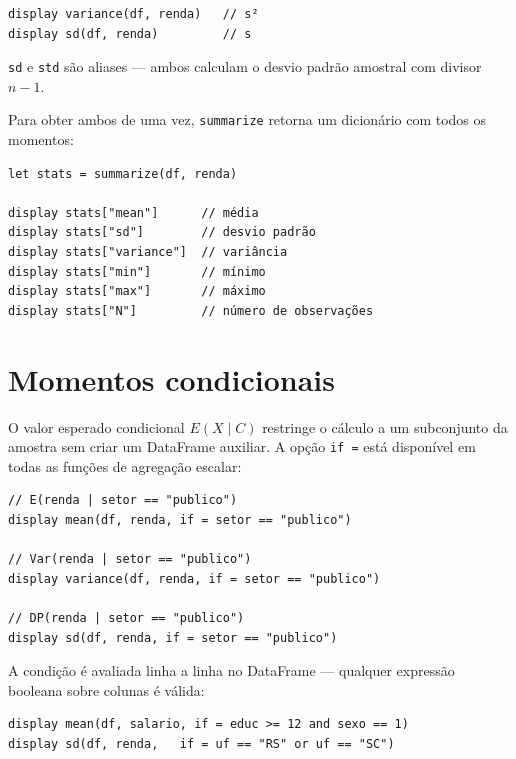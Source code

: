 \begin{lstlisting}[caption={Variância e desvio padrão}]
display variance(df, renda)   // s²
display sd(df, renda)         // s
\end{lstlisting}

\begin{nota}
  \lstinline{sd} e \lstinline{std} são aliases — ambos calculam o desvio padrão
  amostral com divisor $n-1$.
\end{nota}

Para obter ambos de uma vez, \lstinline{summarize} retorna um dicionário com
todos os momentos:

\begin{lstlisting}
let stats = summarize(df, renda)

display stats["mean"]      // média
display stats["sd"]        // desvio padrão
display stats["variance"]  // variância
display stats["min"]       // mínimo
display stats["max"]       // máximo
display stats["N"]         // número de observações
\end{lstlisting}

\section{Momentos condicionais}

O valor esperado condicional $E(X \mid C)$ restringe o cálculo a um subconjunto
da amostra sem criar um DataFrame auxiliar. A opção \lstinline{if =} está
disponível em todas as funções de agregação escalar:

\begin{lstlisting}[caption={Momentos condicionais com if =}]
// E(renda | setor == "publico")
display mean(df, renda, if = setor == "publico")

// Var(renda | setor == "publico")
display variance(df, renda, if = setor == "publico")

// DP(renda | setor == "publico")
display sd(df, renda, if = setor == "publico")
\end{lstlisting}

A condição é avaliada linha a linha no DataFrame — qualquer expressão booleana
sobre colunas é válida:

\begin{lstlisting}[caption={Condições compostas}]
display mean(df, salario, if = educ >= 12 and sexo == 1)
display sd(df, renda,   if = uf == "RS" or uf == "SC")
\end{lstlisting}

